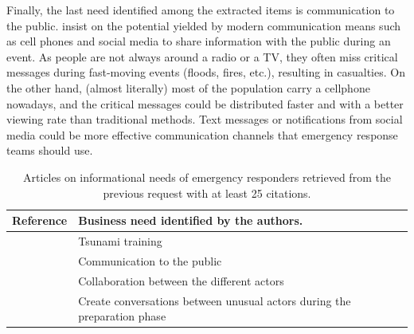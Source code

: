 Finally, the last need identified among the extracted items is communication to the public.
\textcite{aloudatRegulationUbiquitousMobile2011} insist on the potential yielded by modern communication means such as cell phones and social media to share information with the public during an event.
As people are not always around a radio or a TV, they often miss critical messages during fast-moving events (floods, fires, etc.), resulting in casualties.
On the other hand, (almost literally) most of the population carry a cellphone nowadays, and the critical messages could be distributed faster and with a better viewing rate than traditional methods.
Text messages or notifications from social media could be more effective communication channels that emergency response teams should use.

\begin{table}[hbp]
    \centering
    \renewcommand{\arraystretch}{1.5}
    \caption{Articles on informational needs of emergency responders retrieved from the previous request with at least 25 citations.}
    \begin{tabular}{m{} m{}}
        Reference                                                   & Business need identified by the authors.                                                                                                                                                                              \\ [0.5ex]
        \toprule
        \cite{lindellTsunamiPreparednessOregon2010}                 & Tsunami training                                                                                                                                                                                                      \\
        \cite{aloudatRegulationUbiquitousMobile2011}                & Communication to the public                                                                                                                                                                                           \\
        \cite{berlinWhyCollaborationMinimised2011}                  & Collaboration between the different actors                                                                                                                                                                            \\
        \cite{parkerSurfaceWaterFlood2011}                          & Create conversations between unusual actors during the preparation phase                                                                                                                                              \\

\end{tabular}
\end{table}

